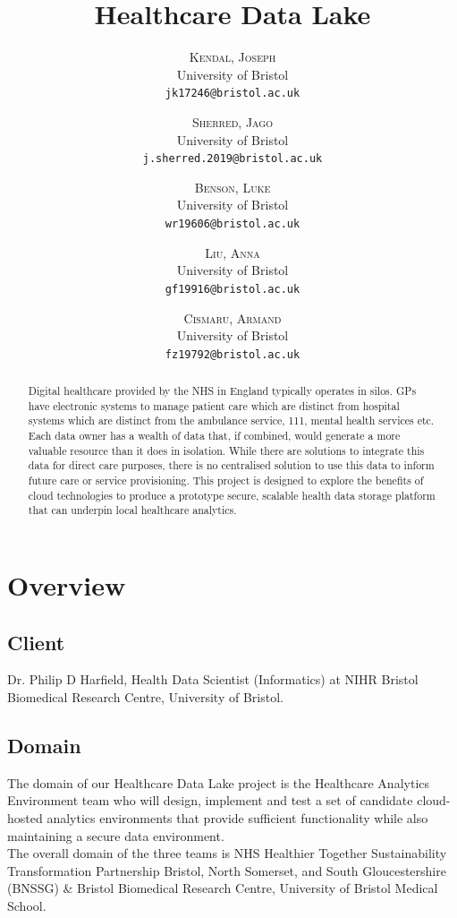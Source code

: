 \documentclass[10pt]{article}
\title{Healthcare Data Lake}
\author{
	\textsc{Kendal, Joseph}\\
	\normalsize University of Bristol\\
	\texttt{jk17246@bristol.ac.uk}
	
	\and
	
	\textsc{Sherred, Jago}\\
	\normalsize University of Bristol\\
	\texttt{j.sherred.2019@bristol.ac.uk}
	
	\and
	
	\textsc{Benson, Luke}\\
	\normalsize University of Bristol\\
	\texttt{wr19606@bristol.ac.uk}
	
	\and
	
	\textsc{Liu, Anna}\\
	\normalsize University of Bristol\\
	\texttt{gf19916@bristol.ac.uk}
	
	\and
	
	\textsc{Cismaru, Armand}\\
	\normalsize University of Bristol\\
	\texttt{fz19792@bristol.ac.uk}
}
\begin{document}
\maketitle    


\begin{abstract}

Digital healthcare provided by the NHS in England typically operates in silos. GPs have electronic systems to manage patient care which are distinct from hospital systems which are distinct from the ambulance service, 111, mental health services etc. Each data owner has a wealth of data that, if combined, would generate a more valuable resource than it does in isolation. While there are solutions to integrate this data for direct care purposes, there is no centralised solution to use this data to inform future care or service provisioning. This project is designed to explore the benefits of cloud technologies to produce a prototype secure, scalable health data storage platform that can underpin local healthcare analytics.

\end{abstract}

\section{Overview}

\subsection{Client}
Dr. Philip D Harfield, Health Data Scientist (Informatics) at NIHR Bristol Biomedical Research Centre, University of Bristol.
\subsection{Domain}
The domain of our Healthcare Data Lake project is the Healthcare Analytics Environment team who will design, implement and test a set
of candidate cloud-hosted analytics environments that provide sufficient functionality while also maintaining a secure data environment.
\\
The overall domain of the three teams is NHS Healthier Together Sustainability Transformation Partnership Bristol, North Somerset, and South Gloucestershire (BNSSG) \& Bristol Biomedical Research Centre, University of Bristol Medical School.
\end{document}
